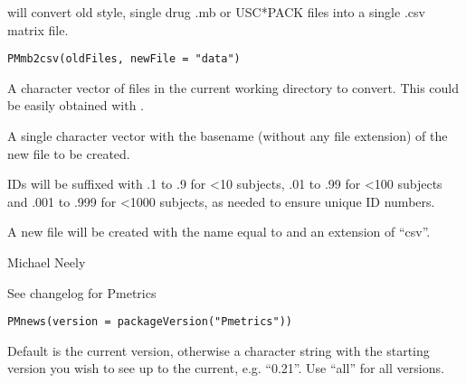 \documentclass[a4paper]{book}
\begin{document}
%
\begin{Description}\relax
{} will convert old style, single drug .mb or USC*PACK files into
a single .csv matrix file.
\end{Description}
%
\begin{Usage}
\begin{verbatim}
PMmb2csv(oldFiles, newFile = "data")
\end{verbatim}
\end{Usage}
%
\begin{Arguments}
\begin{ldescription}
\item[\code{oldFiles}] A character vector of files in the current working directory to convert.
This could be easily obtained with .

\item[\code{newFile}] A single character vector with the basename (without any file extension) of the new file to be created.
\end{ldescription}
\end{Arguments}
%
\begin{Details}\relax
IDs will be suffixed with .1 to .9 for <10 subjects, .01 to .99 for <100 subjects and .001 to .999 for <1000 subjects,
as needed to ensure unique ID numbers.
\end{Details}
%
\begin{Value}
A new file will be created with the name equal to  and
an extension of ``csv''.
\end{Value}
%
\begin{Author}\relax
Michael Neely
\end{Author}
%
\begin{Description}\relax
See changelog for Pmetrics
\end{Description}
%
\begin{Usage}
\begin{verbatim}
PMnews(version = packageVersion("Pmetrics"))
\end{verbatim}
\end{Usage}
%
\begin{Arguments}
\begin{ldescription}
\item[\code{version}] Default is the current version, otherwise a character string with the starting version you wish to see up to 
the current, e.g. ``0.21''.  Use ``all'' for all versions.
\end{ldescription}
\end{Arguments}
\end{document}
